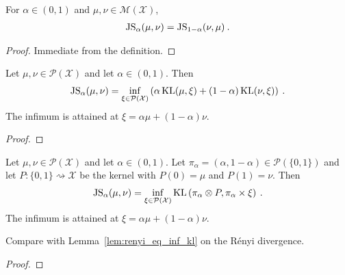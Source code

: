 \begin{lemma}
  \label{lem:jensenShannon_symm}
  For $\alpha \in (0,1)$ and $\mu, \nu \in \mathcal M(\mathcal X)$,
  \begin{align*}
  \operatorname{JS}_\alpha(\mu, \nu) = \operatorname{JS}_{1 - \alpha}(\nu, \mu) \: .
  \end{align*}
\end{lemma}

\begin{proof}%
\uses{}
Immediate from the definition.
\end{proof}


\begin{lemma}
  \label{lem:jensenShannon_eq_inf_add_kl}
  Let $\mu, \nu \in \mathcal P(\mathcal X)$ and let $\alpha \in (0, 1)$. Then
  \begin{align*}
  \operatorname{JS}_\alpha(\mu, \nu) = \inf_{\xi \in \mathcal P(\mathcal X)}\left( \alpha \operatorname{KL}(\mu, \xi) + (1 - \alpha)\operatorname{KL}(\nu, \xi) \right) \: .
  \end{align*}
  The infimum is attained at $\xi = \alpha \mu + (1 - \alpha) \nu$.
\end{lemma}

\begin{proof}%
\uses{}

\end{proof}


\begin{lemma}
  \label{lem:jensenShannon_eq_inf_kl}
  Let $\mu, \nu \in \mathcal P(\mathcal X)$ and let $\alpha \in (0, 1)$. Let $\pi_\alpha = (\alpha, 1 - \alpha) \in \mathcal P(\{0,1\})$ and let $P : \{0,1\} \rightsquigarrow \mathcal X$ be the kernel with $P(0) = \mu$ and $P(1) = \nu$. Then
  \begin{align*}
  \operatorname{JS}_\alpha(\mu, \nu) = \inf_{\xi \in \mathcal P(\mathcal X)} \operatorname{KL}\left( \pi_\alpha \otimes P, \pi_\alpha \times \xi \right) \: .
  \end{align*}
  The infimum is attained at $\xi = \alpha \mu + (1 - \alpha) \nu$.
\end{lemma}

Compare with Lemma~\ref{lem:renyi_eq_inf_kl} on the Rényi divergence.

\begin{proof}%
\uses{}

\end{proof}



